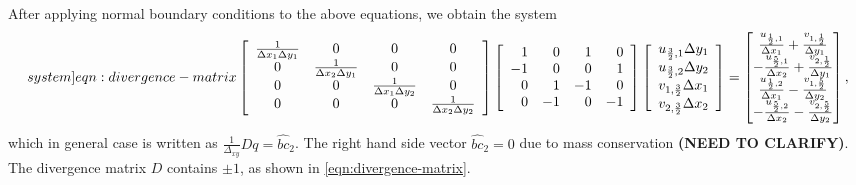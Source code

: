 \documentclass{article}
\numberwithin{equation}{section}
\begin{document}
After applying normal boundary conditions to the above equations, we obtain the system
\begin{equation}\label[system]{eqn:divergence-matrix}
\left[\begin{array}{cccc}
\frac{1}{\Delta x_1 \Delta y_1} & 0 & 0 & 0 \\
0 & \frac{1}{\Delta x_2 \Delta y_1} & 0 & 0 \\
0 & 0 & \frac{1}{\Delta x_1 \Delta y_2} & 0 \\
0 & 0 & 0 & \frac{1}{\Delta x_2 \Delta y_2}
\end{array}\right]\left[\begin{array}{rrrrrr}
1  & 0  & 1 & 0 \\
-1 & 0  & 0 & 1 \\
0 & 1  & -1 & 0 \\
0 & -1  & 0 & -1
\end{array}\right]\left[\begin{array}{l}
u_{\frac{3}{2},1} \Delta y_1 \\
u_{\frac{3}{2},2} \Delta y_2 \\
v_{1,\frac{3}{2}} \Delta x_1 \\
v_{2,\frac{3}{2}} \Delta x_2
\end{array}\right]=
\begin{bmatrix}{}
\frac{u_{\frac{1}{2},1}}{\Delta x_1}+\frac{v_{1,\frac{1}{2}}}{\Delta y_1} \\
-\frac{u_{\frac{5}{2},1}}{\Delta x_2}+\frac{v_{2,\frac{1}{2}}}{\Delta y_1} \\
\frac{u_{\frac{1}{2},2}}{\Delta x_1}-\frac{v_{1,\frac{5}{2}}}{\Delta y_2} \\
-\frac{u_{\frac{5}{2},2}}{\Delta x_2}-\frac{v_{2,\frac{5}{2}}}{\Delta y_2}
\end{bmatrix},
\end{equation}
which in general case is written as 
$\frac{1}{\Delta_{xy}} D q=\hat{bc}_2$.
The right hand side vector $\hat{bc}_2=0$ due to mass conservation \textbf{(NEED TO CLARIFY)}. The divergence matrix $D$ contains $\pm1$, as shown in \cref{eqn:divergence-matrix}. 

\end{document}
